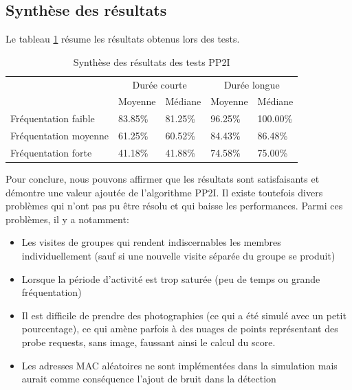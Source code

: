 \subsection{Synthèse des résultats}

Le tableau \ref{tab:synthese_pp2i} résume les résultats obtenus lors des tests.

\begin{table}[H]
    \begin{tabular}{lllll}
                          & \multicolumn{2}{c}{Durée courte} & \multicolumn{2}{c}{Durée longue} \\
                          & Moyenne         & Médiane        & Moyenne        & Médiane         \\
    Fréquentation faible  & 83.85\%         & 81.25\%        & 96.25\%        & 100.00\%        \\
    Fréquentation moyenne & 61.25\%         & 60.52\%        & 84.43\%        & 86.48\%         \\
    Fréquentation forte   & 41.18\%         & 41.88\%        & 74.58\%        & 75.00\%        
    \end{tabular}
\caption{Synthèse des résultats des tests PP2I}
\label{tab:synthese_pp2i}
\end{table}

Pour conclure, nous pouvons affirmer que les résultats sont satisfaisants et démontre une valeur ajoutée de l'algorithme PP2I. 
Il existe toutefois divers problèmes qui n'ont pas pu être résolu et qui baisse les performances. Parmi ces problèmes, il y a notamment:
\begin{itemize}
    \item Les visites de groupes qui rendent indiscernables les membres individuellement (sauf si une nouvelle visite séparée du groupe se produit)
    \item Lorsque la période d'activité est trop saturée (peu de temps ou grande fréquentation)
    \item Il est difficile de prendre des photographies (ce qui a été simulé avec un petit pourcentage), ce qui amène parfois à des nuages de points représentant des probe requests, sans image, faussant ainsi le calcul du score.
    \item Les adresses MAC aléatoires ne sont implémentées dans la simulation mais aurait comme conséquence l'ajout de bruit dans la détection 
\end{itemize}






